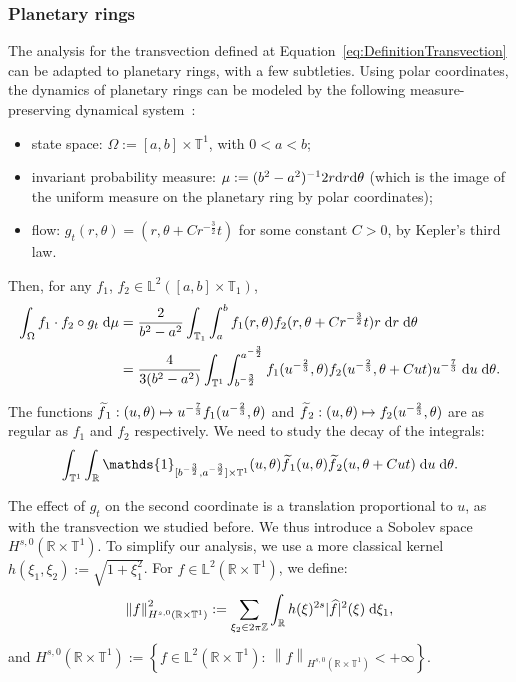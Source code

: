 \documentclass[10pt]{amsart}
\theoremstyle{definition}\newtheorem{defi}[theo]{Definition}\newtheorem{rema}[theo]{Remark}\newtheorem{exam}[theo]{Example}\newtheorem{exem}[theo]{Example}\newtheorem{nota}[theo]{Notation}
\newcommand{\Z}{\mathbb{Z}}
\newcommand{\R}{\mathbb{R}}
\newcommand{\Lbb}{\mathbb{L}}
\newcommand{\Tbb}{\mathbb{T}}
\newcommand{\dd}{\;{\rm d}}
\newcommand{\de}{{\rm d}}
\newcommand{\norm}[2]{\left\| #1 \right\|_{#2}}
\newcommand*{\un}{\mathds{1}}
\let\oldtilde\tilde
\renewcommand*{\tilde}[1]{\mathchoice{\widetilde{#1}}{\widetilde{#1}}{\oldtilde{#1}}{\oldtilde{#1}}}\let\oldhat\hat
\renewcommand*{\hat}[1]{\mathchoice{\widehat{#1}}{\widehat{#1}}{\oldhat{#1}}{\oldhat{#1}}}\let\oldforall\forall
\renewcommand*{\forall}{\mathrel{\oldforall}}
\begin{document}
\subsubsection{Planetary rings}\label{subsubsec:AnneauxPlanetaires}

The analysis for the transvection defined at Equation~\eqref{eq:DefinitionTransvection} can be adapted to planetary rings, with a few subtleties. Using polar coordinates, the dynamics of planetary rings can be modeled by the following measure-preserving dynamical system~:
\begin{itemize}
\item state space: $\Omega := [a,b] \times \Tbb^1$, with $0 < a < b$;
\item invariant probability measure: $\mu := (b^2-a^2)^{-1} 2 r \de r \de \theta$ (which is the image of the uniform measure on the planetary ring by polar coordinates);
\item flow: $g_t (r, \theta) = (r, \theta+Cr^{-\frac{3}{2}} t)$ for some constant $C>0$, by Kepler's third law.
\end{itemize}
Then, for any $f_1$, $f_2 \in \Lbb^2 ([a,b] \times \Tbb_1)$,
\begin{align*}
\int_\Omega f_1 \cdot f_2 \circ g_t \dd \mu & = \frac{2}{b^2-a^2} \int_{\Tbb_1} \int_a^b f_1 (r, \theta) f_2 (r, \theta+Cr^{-\frac{3}{2}} t) r \dd r \dd \theta \\
& = \frac{4}{3(b^2-a^2)} \int_{\Tbb^1} \int_{b^{-\frac{3}{2}}}^{a^{-\frac{3}{2}}} f_1 (u^{-\frac{2}{3}}, \theta) f_2 (u^{-\frac{2}{3}}, \theta+C u t) u^{-\frac{7}{3}} \dd u \dd \theta.
\end{align*}

The functions $\tilde{f}_1: (u, \theta) \mapsto u^{-\frac{7}{3}} f_1 (u^{-\frac{2}{3}}, \theta)$ and $\tilde{f}_2:(u, \theta) \mapsto f_2 (u^{-\frac{2}{3}}, \theta)$ are as regular as $f_1$ and $f_2$ respectively. We need to study the decay of the integrals:
\[
\int_{\Tbb^1} \int_\R \un_{[b^{-\frac{3}{2}}, a^{-\frac{3}{2}}]\times \Tbb^1} (u,\theta) \tilde{f}_1 (u, \theta) \tilde{f}_2 (u, \theta+C u t) \dd u \dd \theta.
\]

The effect of $g_t$ on the second coordinate is a translation proportional to $u$, as with the transvection we studied before. We thus introduce a Sobolev space $H^{s, 0} (\R \times \Tbb^1)$. To simplify our analysis, we use a more classical kernel $h(\xi_1, \xi_2) := \sqrt{1+\xi_1^2}$. For $f\in \Lbb^2 (\R \times \Tbb^1)$, we define:
\[
\norm{f}{H^{s,0} (\R \times \Tbb^1)}^2 := \sum_{\xi_2 \in 2\pi\Z} \int_\R h(\xi)^{2s} |\hat{f}|^2 (\xi) \dd \xi_1,
\]
and $H^{s,0} (\R \times \Tbb^1) := \left\{ f \in \Lbb^2 (\R \times \Tbb^1): \ \norm{f}{H^{s,0} (\R \times \Tbb^1)} <+\infty \right\}$.
\end{document}
